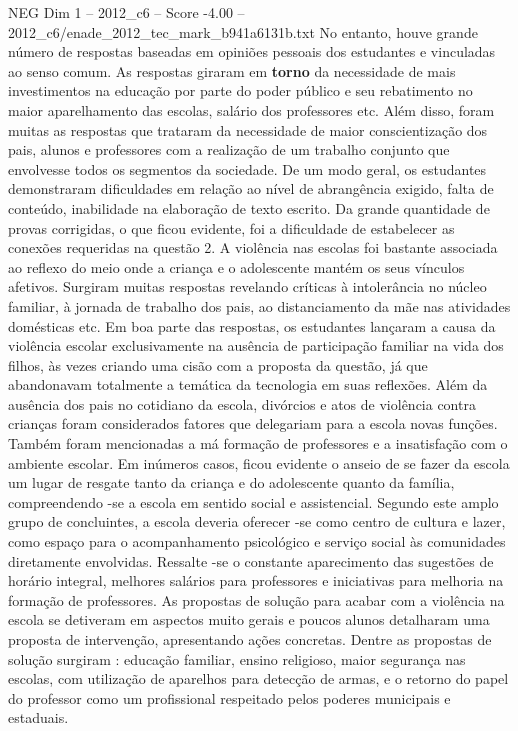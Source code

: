 \begin{textsample}{NEG Dim 1 – 2012\_c6 – Score -4.00 – 2012\_c6/enade\_2012\_tec\_mark\_b941a6131b.txt}
No entanto, houve grande número de respostas baseadas em opiniões pessoais dos estudantes e vinculadas ao senso comum.
As respostas giraram em \textbf{torno} da necessidade de mais investimentos na educação por parte do poder público e seu rebatimento no maior aparelhamento das escolas, salário dos professores etc.
Além disso, foram muitas as respostas que trataram da necessidade de maior conscientização dos pais, alunos e professores com a realização de um trabalho conjunto que envolvesse todos os segmentos da sociedade.
De um modo geral, os estudantes demonstraram dificuldades em relação ao nível de abrangência exigido, falta de conteúdo, inabilidade na elaboração de texto escrito.
Da grande quantidade de provas corrigidas, o que ficou evidente, foi a dificuldade de estabelecer as conexões requeridas na questão 2.
A violência nas escolas foi bastante associada ao reflexo do meio onde a criança e o adolescente mantém os seus vínculos afetivos.
Surgiram muitas respostas revelando críticas à intolerância no núcleo familiar, à jornada de trabalho dos pais, ao distanciamento da mãe nas atividades domésticas etc.
Em boa parte das respostas, os estudantes lançaram a causa da violência escolar exclusivamente na ausência de participação familiar na vida dos filhos, às vezes criando uma cisão com a proposta da questão, já que abandonavam totalmente a temática da tecnologia em suas reflexões.
Além da ausência dos pais no cotidiano da escola, divórcios e atos de violência contra crianças foram considerados fatores que delegariam para a escola novas funções.
Também foram mencionadas a má formação de professores e a insatisfação com o ambiente escolar.
Em inúmeros casos, ficou evidente o anseio de se fazer da escola um lugar de resgate tanto da criança e do adolescente quanto da família, compreendendo -se a escola em sentido social e assistencial.
Segundo este amplo grupo de concluintes, a escola deveria oferecer -se como centro de cultura e lazer, como espaço para o acompanhamento psicológico e serviço social às comunidades diretamente envolvidas.
Ressalte -se o constante aparecimento das sugestões de horário integral, melhores salários para professores e iniciativas para melhoria na formação de professores.
As propostas de solução para acabar com a violência na escola se detiveram em aspectos muito gerais e poucos alunos detalharam uma proposta de intervenção, apresentando ações concretas.
Dentre as propostas de solução surgiram : educação familiar, ensino religioso, maior segurança nas escolas, com utilização de aparelhos para detecção de armas, e o retorno do papel do professor como um profissional respeitado pelos poderes municipais e estaduais.

\end{textsample}
